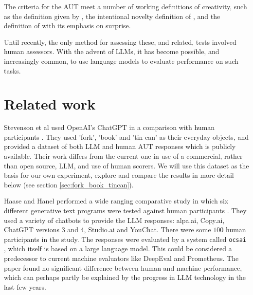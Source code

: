 \documentclass{article}
\begin{document}
The criteria for the AUT meet a number of working definitions of creativity, such as the definition given by \citet{runco2012standard}, the intentional novelty definition of \citet{weisberg2016creativity}, and the definition of \citet{simonton2018defining} with its emphasis on surprise.




Until recently, the only method for assessing these, and related, tests involved human assessors. With the advent of LLMs, it has become possible, and increasingly common, to use language models to evaluate performance on such tasks. 

\section{Related work}
\label{sec:related_work}
Stevenson et al used OpenAI's ChatGPT in a comparison with human participants \cite{stevenson2022puttinggpt3screativityalternative}. They used 'fork', 'book' and 'tin can' as their everyday objects, and provided a dataset of both LLM and human AUT responses which is publicly available. Their work differs from the current one in use of a commercial, rather than open source, LLM, and use of human scorers. We will use this dataset as the basis for our own experiment, explore and compare the results in more detail below (see section \ref{sec:fork_book_tincan}).  




Haase and Hanel performed a wide ranging comparative study in which six different generative text programs were tested against human participants \citet{Haase_2023}. They used a variety of chatbots to provide the LLM responses: alpa.ai, Copy.ai, ChatGPT versions 3 and 4, Studio.ai and YouChat. There were some $100$ human participants in the study. The responses were evaluated by a system called \texttt{ocsai} \citet{organisciak2023beyond}, which itself is based on a large language model. This could be considered a predecessor to current machine evaluators like DeepEval and Prometheus. The paper found no significant difference between human and machine performance, which can perhaps partly be explained by the progress in LLM technology in the last few years.     
\end{document}
